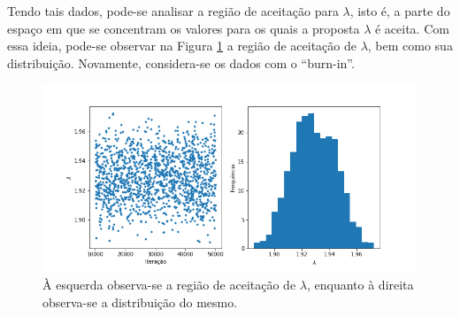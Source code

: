 \documentclass[11pt,letterpaper,twocolumn]{article}
\begin{document}
Tendo tais dados, pode-se analisar a região de aceitação para $\lambda$, isto é, a parte do espaço em que se concentram os valores para os quais a proposta $\lambda$ é aceita. Com essa ideia, pode-se observar na Figura \ref{fig07p} a região de aceitação de $\lambda$, bem como sua distribuição. Novamente, considera-se os dados com o ``burn-in''.
\begin{figure}[hbt]
    \centering
    \includegraphics[scale = 0.40, center]{Poisson/fig07 - poisson.png}
    \caption{À esquerda observa-se a região de aceitação de $\lambda$, enquanto à direita observa-se a distribuição do mesmo.}
    \label{fig07p}
\end{figure}
\end{document}
